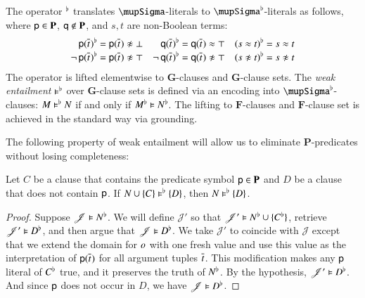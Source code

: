 \begin{rep}
\begin{defi}
The operator $^\flat$ translates $\mupSigma$-literals to
$\mupSigma\Wksup$-literals as follows, where $\mathsf{p} \in \mathbf{P}$,
$\mathsf{q} \notin \mathbf{P}$, and $s, t$ are non-Boolean terms:
\pagebreak[2]
%
\begin{align*}
  \Wk{\cst{p}(\tuple{t}{})} & = \cst{p}(\tuple{t}{}) \noteq \false
& \Wk{\cst{q}(\tuple{t}{})} & = \cst{q}(\tuple{t}{}) \eq \true
& \Wk{(s \eq t)} & = s \eq t \\[-\jot]
  \Wk{\lnot\,\cst{p}(\tuple{t}{})} & = \cst{p}(\tuple{t}{}) \noteq \true
& \Wk{\lnot\,\cst{q}(\tuple{t}{})} & = \cst{q}(\tuple{t}{}) \noteq \true
& \Wk{(s \noteq t)} & = s \noteq t
\end{align*}
%
The operator is lifted elementwise to $\mathbf{G}$-clauses and
$\mathbf{G}$-clause sets.
The \emph{weak entailment} $\vDash^\flat$ over $\mathbf{G}$-clause sets
is defined via an encoding into $\mupSigma\Wksup$-clauses:
$M \vDash^\flat N$ if and only if $M^\flat \vDash N^\flat$.
The lifting to $\mathbf{F}$-clauses and $\mathbf{F}$-clause set is achieved
in the standard way via grounding.
\end{defi}

The following property of weak entailment will allow us to eliminate
$\mathbf{P}$-predicates without losing completeness:

\begin{lemma}
\label{lem:p-Wk-entail}
Let $C$ be a clause that contains the predicate symbol $\mathsf{p} \in
\mathbf{P}$ and $D$ be a clause that does not contain $\mathsf{p}$. If $N
\cup \{C\} \vDash^\flat \{D\}$, then $N \vDash^\flat \{D\}$.
\end{lemma}

\begin{proof}
Suppose $\mathscr{J} \vDash N^\flat$. We will define $\mathscr{J}'$ so that
$\mathscr{J}' \vDash N^\flat \cup \{C^\flat\}$, retrieve $\mathscr{J}'
\vDash D^\flat$, and then argue that $\mathscr{J} \vDash D^\flat$. We
take $\mathscr{J}'$ to coincide with $\mathscr{J}$ except that we extend the
domain for $o$ with one fresh value and use this value as the
interpretation of $\mathsf{p}(\overline{t}_{})$ for all argument tuples $\overline{t}_{}$.
This modification makes any $\mathsf{p}$ literal of $C^\flat$ true, and it
preserves the truth of $N^\flat$. By the hypothesis, $\mathscr{J}' \vDash
D^\flat$. And since $\mathsf{p}$ does not occur in $D$, we have $\mathscr{J}
\vDash D^\flat$.
\end{proof}


\end{rep}
